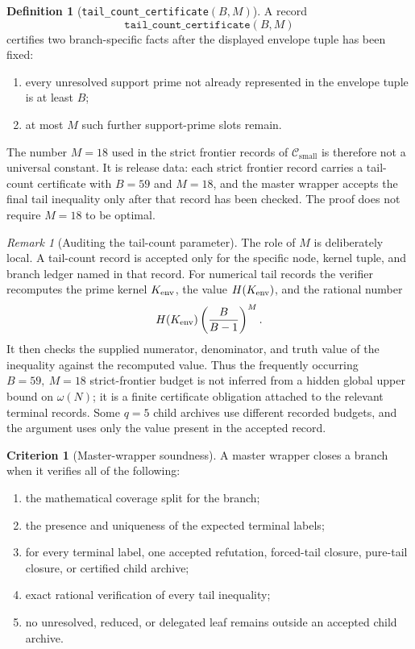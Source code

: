 \documentclass[11pt]{article}
\theoremstyle{definition}
\newtheorem{definition}[theorem]{Definition}
\newtheorem{criterion}[theorem]{Criterion}
\theoremstyle{remark}
\newtheorem{remark}[theorem]{Remark}
\newcommand{\Hfun}{H}
\newcommand{\Csmall}{\ensuremath{\mathcal C_{\mathrm{small}}}}
\begin{document}
\begin{definition}[\texttt{tail\_count\_certificate}\((B,M)\)]
\label{def:tail-count-certificate}
A record
\[
  \texttt{tail\_count\_certificate}(B,M)
\]
certifies two branch-specific facts after the displayed envelope tuple has been
fixed:
\begin{enumerate}[label=(\roman*),leftmargin=2.2em]
\item every unresolved support prime not already represented in the envelope
tuple is at least \(B\);
\item at most \(M\) such further support-prime slots remain.
\end{enumerate}
The number \(M=18\) used in the strict frontier records of \(\Csmall\) is
therefore not a universal constant.  It is release data: each strict frontier
record carries a tail-count certificate with \(B=59\) and \(M=18\), and the
master wrapper accepts the final tail inequality only after that record has
been checked.  The proof does not require \(M=18\) to be optimal.
\end{definition}

\begin{remark}[Auditing the tail-count parameter]
\label{rem:tail-count-audit}
The role of \(M\) is deliberately local.  A tail-count record is accepted only
for the specific node, kernel tuple, and branch ledger named in that record.
For numerical tail records the verifier recomputes the prime kernel
\(K_{\rm env}\), the value \(\Hfun(K_{\rm env})\), and the rational number
\[
  \Hfun(K_{\rm env})\left(\frac{B}{B-1}\right)^M.
\]
It then checks the supplied numerator, denominator, and truth value of the
inequality against the recomputed value.  Thus the frequently occurring
\(B=59,\ M=18\) strict-frontier budget is not inferred from a hidden global
upper bound on \(\omega(N)\); it is a finite certificate obligation attached to
the relevant terminal records.  Some \(q=5\) child archives use different
recorded budgets, and the argument uses only the value present in the accepted
record.
\end{remark}

\begin{criterion}[Master-wrapper soundness]
\label{crit:master-wrapper}
A master wrapper closes a branch when it verifies all of the following:
\begin{enumerate}[label=(\roman*),leftmargin=2.2em]
\item the mathematical coverage split for the branch;
\item the presence and uniqueness of the expected terminal labels;
\item for every terminal label, one accepted refutation, forced-tail closure,
pure-tail closure, or certified child archive;
\item exact rational verification of every tail inequality;
\item no unresolved, reduced, or delegated leaf remains outside an accepted
child archive.
\end{enumerate}
\end{criterion}
\end{document}
